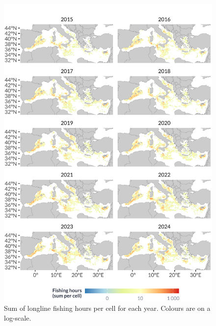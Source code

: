 \begin{figure}[H]
	\centering
	\includegraphics[width=1\linewidth, trim=0 0 0 0,clip]{Figures/plots/dll_yearly.pdf}
	\caption{Sum of longline fishing hours per cell for each year. Colours are on a log-scale.}
	\label{fig:dll_yearly}
\end{figure}

